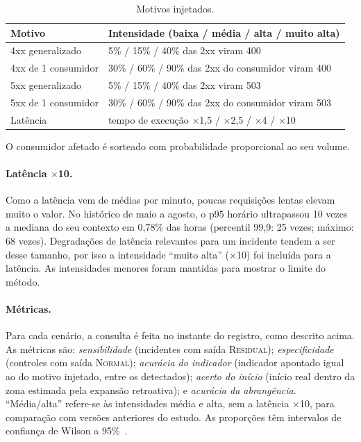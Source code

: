 \documentclass[sigconf,nonacm]{acmart}
\newcommand{\Normal}{\textsc{Normal}\xspace}
\newcommand{\Residual}{\textsc{Residual}\xspace}
\begin{document}
\begin{table}[t]
  \caption{Motivos injetados.}
  \label{tab:falhas}
  \small
  \begin{tabular}{p{}p{}}
    \toprule
    Motivo & Intensidade (baixa / média / alta / muito alta) \\
    \midrule
    4xx generalizado & 5\% / 15\% / 40\% das 2xx viram 400 \\
    4xx de 1 consumidor & 30\% / 60\% / 90\% das 2xx do consumidor viram 400 \\
    5xx generalizado & 5\% / 15\% / 40\% das 2xx viram 503 \\
    5xx de 1 consumidor & 30\% / 60\% / 90\% das 2xx do consumidor viram 503 \\
    Latência & tempo de execução $\times$1,5 / $\times$2,5 / $\times$4 / $\times$10 \\
    \bottomrule
  \end{tabular}
  \par\smallskip\footnotesize O consumidor afetado é sorteado com probabilidade proporcional ao seu volume.
\end{table}

\paragraph{Latência $\times$10.} Como a latência vem de médias por minuto, poucas requisições lentas elevam muito o valor. No histórico de maio a agosto, o p95 horário ultrapassou 10 vezes a mediana do seu contexto em 0,78\% das horas (percentil 99,9: 25 vezes; máximo: 68 vezes). Degradações de latência relevantes para um incidente tendem a ser desse tamanho, por isso a intensidade ``muito alta'' ($\times$10) foi incluída para a latência. As intensidades menores foram mantidas para mostrar o limite do método.

\paragraph{Métricas.} Para cada cenário, a consulta é feita no instante do registro, como descrito acima. As métricas são: \emph{sensibilidade} (incidentes com saída \Residual); \emph{especificidade} (controles com saída \Normal); \emph{acurácia do indicador} (indicador apontado igual ao do motivo injetado, entre os detectados); \emph{acerto do início} (início real dentro da zona estimada pela expansão retroativa); e \emph{acurácia da abrangência}. ``Média/alta'' refere-se às intensidades média e alta, sem a latência $\times$10, para comparação com versões anteriores do estudo. As proporções têm intervalos de confiança de Wilson a 95\%~\citep{wilson1927probable}.
\end{document}
